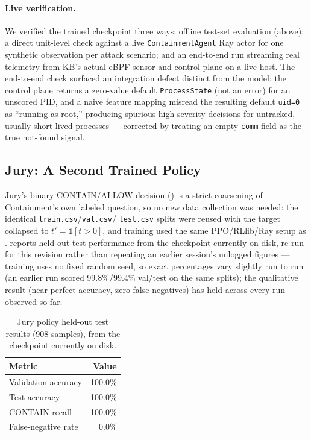 \documentclass{article}
\begin{document}
\paragraph{Live verification.} We verified the trained checkpoint three
ways: offline test-set evaluation (above); a direct unit-level check
against a live \texttt{ContainmentAgent} Ray actor for one synthetic
observation per attack scenario; and an end-to-end run streaming real
telemetry from KB's actual eBPF sensor and control plane on a live
host. The end-to-end check surfaced an integration defect distinct from
the model: the control plane returns a zero-value default
\texttt{ProcessState} (not an error) for an unscored PID, and a naive
feature mapping misread the resulting default \texttt{uid=0} as
``running as root,'' producing spurious high-severity decisions for
untracked, usually short-lived processes --- corrected by treating an
empty \texttt{comm} field as the true not-found signal.

\subsection{Jury: A Second Trained Policy}
\label{sec:jury-rl}

Jury's binary CONTAIN/ALLOW decision () is a strict
coarsening of Containment's own labeled question, so no new data
collection was needed: the identical \texttt{train.csv}/\texttt{val.csv}/
\texttt{test.csv} splits were reused with the target collapsed to
$t' = \mathbb{1}[t>0]$, and training used the same PPO/RLlib/Ray setup
as .  reports held-out test
performance from the checkpoint currently on disk, re-run for this
revision rather than repeating an earlier session's unlogged figures
--- training uses no fixed random seed, so exact percentages vary
slightly run to run (an earlier run scored 99.8\%/99.4\% val/test on
the same splits); the qualitative result (near-perfect accuracy, zero
false negatives) has held across every run observed so far.

\begin{table}[h]
\centering
\caption{Jury policy held-out test results (908 samples), from the
checkpoint currently on disk.}
\label{tab:jury-results}
\begin{tabular}{lr}
\toprule
Metric & Value \\
\midrule
Validation accuracy & 100.0\% \\
Test accuracy & 100.0\% \\
CONTAIN recall & 100.0\% \\
False-negative rate & 0.0\% \\
\bottomrule
\end{tabular}
\end{table}
\end{document}

